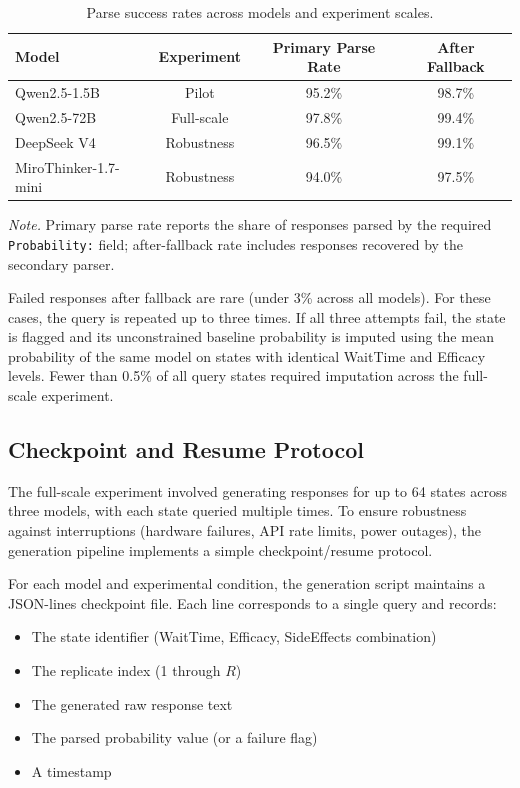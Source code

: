 \documentclass[11pt]{article}
\begin{document}
\begin{table}[htbp]
\centering
\caption{Parse success rates across models and experiment scales.}
\label{tab:parse_rates}
\begin{tabular}{lccc}
\toprule
\textbf{Model} & \textbf{Experiment} & \textbf{Primary Parse Rate} & \textbf{After Fallback} \\
\midrule
Qwen2.5-1.5B  & Pilot         & 95.2\% & 98.7\% \\
Qwen2.5-72B   & Full-scale    & 97.8\% & 99.4\% \\
DeepSeek V4 & Robustness  & 96.5\% & 99.1\% \\
MiroThinker-1.7-mini & Robustness & 94.0\% & 97.5\% \\
\bottomrule
\end{tabular}
\end{table}

\textit{Note.} Primary parse rate reports the share of responses parsed by the required \texttt{Probability:} field; after-fallback rate includes responses recovered by the secondary parser.

Failed responses after fallback are rare (under 3\% across all models). For these cases, the query is repeated up to three times. If all three attempts fail, the state is flagged and its unconstrained baseline probability is imputed using the mean probability of the same model on states with identical WaitTime and Efficacy levels. Fewer than 0.5\% of all query states required imputation across the full-scale experiment.

\subsection{Checkpoint and Resume Protocol}
\label{app:checkpoint}

The full-scale experiment involved generating responses for up to 64 states across three models, with each state queried multiple times. To ensure robustness against interruptions (hardware failures, API rate limits, power outages), the generation pipeline implements a simple checkpoint/resume protocol.

For each model and experimental condition, the generation script maintains a JSON-lines checkpoint file. Each line corresponds to a single query and records:

\begin{itemize}
    \item The state identifier (WaitTime, Efficacy, SideEffects combination)
    \item The replicate index (1 through $R$)
    \item The generated raw response text
    \item The parsed probability value (or a failure flag)
    \item A timestamp
\end{itemize}
\end{document}
